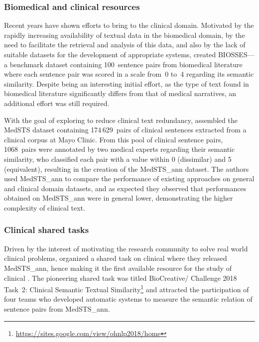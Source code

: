 \subsubsection{Biomedical and clinical  resources}

Recent years have shown efforts to bring  to the clinical domain.
Motivated by the rapidly increasing availability of textual data in the biomedical domain, by the need to facilitate the retrieval and analysis of this data, and also by the lack of suitable datasets for the development of appropriate systems, \textcite{sogancioglu2017a} created BIOSSES---a benchmark dataset containing 100~sentence pairs from biomedical literature where each sentence pair was scored in a scale from~0 to~4 regarding its semantic similarity.
Despite being an interesting initial effort, as the type of text found in biomedical literature significantly differs from that of medical narratives, an additional effort was still required.

With the goal of exploring  to reduce clinical text redundancy, \textcite{wang2018d} assembled the MedSTS dataset containing 174\,629~pairs of clinical sentences extracted from a clinical corpus at Mayo Clinic.
From this pool of clinical sentence pairs, 1068~pairs were annotated by two medical experts regarding their semantic similarity, who classified each pair with a value within 0 (dissimilar) and 5 (equivalent), resulting in the creation of the MedSTS\_ann dataset.
The authors used MedSTS\_ann to compare the performance of existing  approaches on general and clinical domain  datasets, and as expected they observed that performances obtained on MedSTS\_ann were in general lower, demonstrating the higher complexity of clinical text.


\subsubsection{Clinical  shared tasks}

Driven by the interest of motivating the research community to solve real world clinical problems, \textcite{wang2018e} organized a shared task on clinical  where they released MedSTS\_ann, hence making it the first available resource for the study of clinical .
The pioneering shared task was titled BioCreative/ Challenge 2018 Task~2: Clinical Semantic Textual Similarity\footnote{\url{https://sites.google.com/view/ohnlp2018/home}} and attracted the participation of four teams who developed automatic systems to measure the semantic relation of sentence pairs from MedSTS\_ann.

